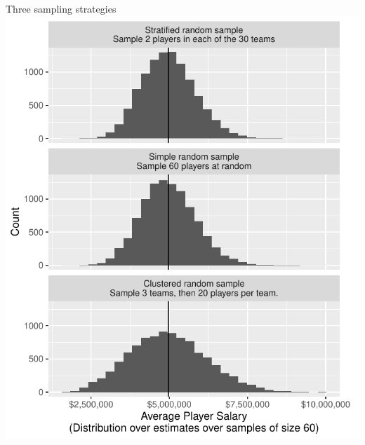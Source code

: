 \documentclass{beamer}
\begin{document}
\begin{frame}{Three sampling strategies}
\includegraphics[height = .8\textheight]{baseball_sampling}
\end{frame}
\end{document}
